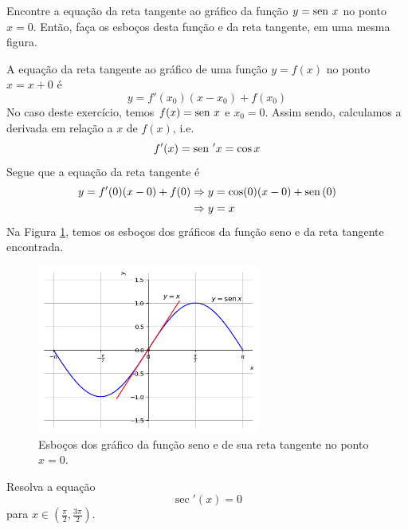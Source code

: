 \cleardoublepage\documentclass[../main.tex]{subfiles}
\begin{document}
\begin{exeresol}
  Encontre a equação da reta tangente ao gráfico da função $y = \operatorname{sen}\, x$ no ponto $x=0$. Então, faça os esboços desta função e da reta tangente, em uma mesma figura.
\end{exeresol}
\begin{resol}
  A equação da reta tangente ao gráfico de uma função $y = f(x)$ no ponto $x=x+0$ é
  \begin{equation*}
    y = f'(x_0)(x-x_0)+f(x_0)
  \end{equation*}
  No caso deste exercício, temos $f(x)=\operatorname{sen}\, x$ e $x_0=0$. Assim sendo, calculamos a derivada em relação a $x$ de $f(x)$, i.e.
  \begin{equation*}
    f'(x) = \operatorname{sen}\,' x = \cos x
  \end{equation*}
  Segue que a equação da reta tangente é
  \begin{align*}
    y = f'(0)(x-0)+f(0) &\Rightarrow y = \cos(0)(x-0)+\operatorname{sen}\,(0) \\
                        &\Rightarrow y = x
  \end{align*}
  Na Figura \ref{fig:deriv_exeresol_rt_sen0}, temos os esboços dos gráficos da função seno e da reta tangente encontrada.

  \begin{figure}[H]
    \centering
    \includegraphics[width=0.65\textwidth]{fig_deriv/fig_deriv_exeresol_rt_sen0}
    \caption{Esboços dos gráfico da função seno e de sua reta tangente no ponto $x=0$.}
    \label{fig:deriv_exeresol_rt_sen0}
  \end{figure}
\end{resol}

\begin{exeresol}
  Resolva a equação
  \begin{equation*}
    \sec'(x) = 0
  \end{equation*}
  para $x\in \left(\frac{\pi}{2}, \frac{3\pi}{2}\right)$.\\
\end{exeresol}
\end{document}
